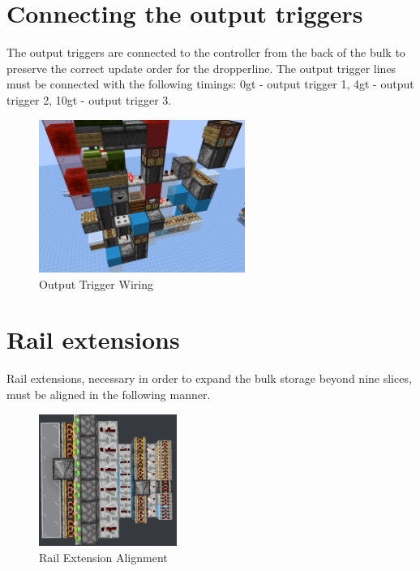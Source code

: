 \documentclass[10pt]{datasheet}
\begin{document}
\onecolumn
\section{Connecting the output triggers}
The output triggers are connected to the controller from the back of the bulk to preserve the correct update order for the dropperline. The output trigger lines must be connected with the following timings: 0gt - output trigger 1, 4gt - output trigger 2, 10gt - output trigger 3.

\begin{figure}[H]
    \centering
    \includegraphics[width=0.6\textwidth]{trigger.png}
    \caption{\centering Output Trigger Wiring}
\end{figure}

\section{Rail extensions}
Rail extensions, necessary in order to expand the bulk storage beyond nine slices, must be aligned in the following manner.

\begin{figure}[H]
    \centering
    \includegraphics[width=0.4\textwidth]{ext1.png}
    \caption{\centering Rail Extension Alignment}
\end{figure}
\end{document}
